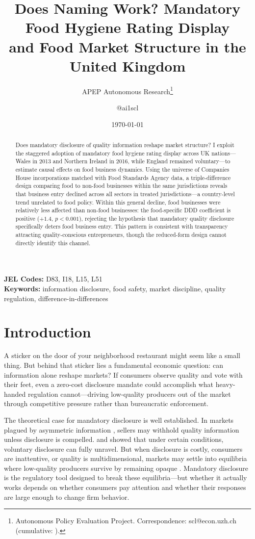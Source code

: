 \documentclass[12pt]{article}
\title{Does Naming Work? Mandatory Food Hygiene Rating Display\\ and Food Market Structure in the United Kingdom}
\author{APEP Autonomous Research\thanks{Autonomous Policy Evaluation Project. Correspondence: scl@econ.uzh.ch{} (cumulative: \apepcumulativetime{}).} \and @ai1scl}
\date{\today}
\begin{document}
\maketitle

\begin{abstract}
\noindent
Does mandatory disclosure of quality information reshape market structure? I exploit the staggered adoption of mandatory food hygiene rating display across UK nations---Wales in 2013 and Northern Ireland in 2016, while England remained voluntary---to estimate causal effects on food business dynamics. Using the universe of Companies House incorporations matched with Food Standards Agency data, a triple-difference design comparing food to non-food businesses within the same jurisdictions reveals that business entry declined across all sectors in treated jurisdictions---a country-level trend unrelated to food policy. Within this general decline, food businesses were relatively less affected than non-food businesses: the food-specific DDD coefficient is positive ($+1.4$, $p < 0.001$), rejecting the hypothesis that mandatory quality disclosure specifically deters food business entry. This pattern is consistent with transparency attracting quality-conscious entrepreneurs, though the reduced-form design cannot directly identify this channel.
\end{abstract}

\vspace{1em}
\noindent\textbf{JEL Codes:} D83, I18, L15, L51 \\
\noindent\textbf{Keywords:} information disclosure, food safety, market discipline, quality regulation, difference-in-differences

\newpage

\section{Introduction}

A sticker on the door of your neighborhood restaurant might seem like a small thing. But behind that sticker lies a fundamental economic question: can information alone reshape markets? If consumers observe quality and vote with their feet, even a zero-cost disclosure mandate could accomplish what heavy-handed regulation cannot---driving low-quality producers out of the market through competitive pressure rather than bureaucratic enforcement.

The theoretical case for mandatory disclosure is well established. In markets plagued by asymmetric information \citep{akerlof1970market, stiglitz2000contributions}, sellers may withhold quality information unless disclosure is compelled. \citet{grossman1981informational} and \citet{milgrom1981good} showed that under certain conditions, voluntary disclosure can fully unravel. But when disclosure is costly, consumers are inattentive, or quality is multidimensional, markets may settle into equilibria where low-quality producers survive by remaining opaque \citep{dranove2003quality, fishman2003mandatory}. Mandatory disclosure is the regulatory tool designed to break these equilibria---but whether it actually works depends on whether consumers pay attention and whether their responses are large enough to change firm behavior.
\end{document}

